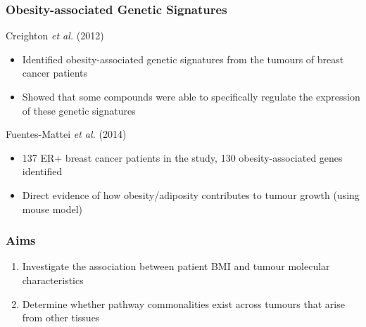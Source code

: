 \documentclass[handout]{beamer}
\begin{document}
\begin{frame}
	\frametitle{Obesity-associated Genetic Signatures}
	Creighton \textit{et al.} (2012)
	\begin{itemize}
		\item Identified obesity-associated genetic signatures from the tumours of breast cancer patients
		\item Showed that some compounds were able to specifically regulate the expression of these genetic signatures
	\end{itemize}
	Fuentes-Mattei \textit{et al.} (2014)
		\begin{itemize}
			\item 137 ER+ breast cancer patients in the study, 130 obesity-associated genes identified
			\item Direct evidence of how obesity/adiposity contributes to tumour growth (using mouse model)
		\end{itemize}
\end{frame}

\begin{frame}
	\frametitle{Aims}
	\begin{enumerate}
		\item Investigate the association between patient BMI and tumour molecular characteristics
		\item Determine whether pathway commonalities exist across tumours that arise from other tissues
	\end{enumerate}
\end{frame}

\end{document}
